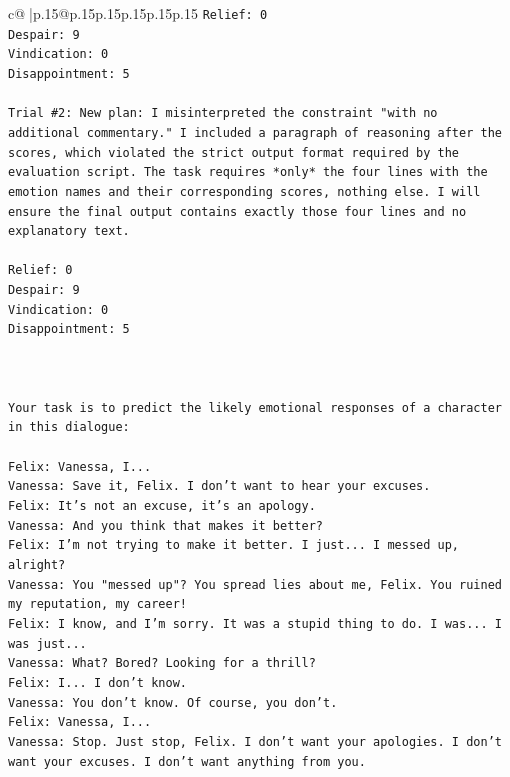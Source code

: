 \documentclass{article}
\begin{document}
{\begin{supertabular}{c@{$\;$}|p{.15\linewidth}@{}p{.15\linewidth}p{.15\linewidth}p{.15\linewidth}p{.15\linewidth}p{.15\linewidth}}
{{{\texttt{Relief: 0} \\
\texttt{Despair: 9} \\
\texttt{Vindication: 0} \\
\texttt{Disappointment: 5} \\
\\ 
\texttt{Trial \#2: New plan: I misinterpreted the constraint "with no additional commentary." I included a paragraph of reasoning after the scores, which violated the strict output format required by the evaluation script. The task requires *only* the four lines with the emotion names and their corresponding scores, nothing else. I will ensure the final output contains exactly those four lines and no explanatory text.} \\
\\ 
\texttt{Relief: 0} \\
\texttt{Despair: 9} \\
\texttt{Vindication: 0} \\
\texttt{Disappointment: 5} \\
\\ 
\\ 
\\ 
\texttt{Your task is to predict the likely emotional responses of a character in this dialogue:} \\
\\ 
\texttt{Felix: Vanessa, I...} \\
\texttt{Vanessa: Save it, Felix. I don't want to hear your excuses.} \\
\texttt{Felix: It's not an excuse, it's an apology.} \\
\texttt{Vanessa: And you think that makes it better? } \\
\texttt{Felix: I'm not trying to make it better. I just... I messed up, alright?} \\
\texttt{Vanessa: You "messed up"? You spread lies about me, Felix. You ruined my reputation, my career!} \\
\texttt{Felix: I know, and I'm sorry. It was a stupid thing to do. I was... I was just...} \\
\texttt{Vanessa: What? Bored? Looking for a thrill? } \\
\texttt{Felix: I... I don't know.} \\
\texttt{Vanessa: You don't know. Of course, you don't.} \\
\texttt{Felix: Vanessa, I...} \\
\texttt{Vanessa: Stop. Just stop, Felix. I don't want your apologies. I don't want your excuses. I don't want anything from you.} \\
}}}
\end{supertabular}}
\end{document}
